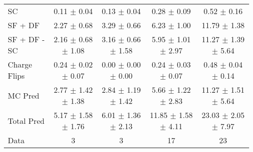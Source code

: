 \begin{tabular}{l|cccc}
                                 SC &  0.11 $\pm$  0.04 &  0.13 $\pm$  0.04 &  0.28 $\pm$  0.09 &  0.52 $\pm$  0.16 \\
                            SF + DF &  2.27 $\pm$  0.68 &  3.29 $\pm$  0.66 &  6.23 $\pm$  1.00 & 11.79 $\pm$  1.38 \\
\hline
                       SF + DF - SC &  2.16 $\pm$  0.68 $\pm$  1.08 &  3.16 $\pm$  0.66 $\pm$  1.58 &  5.95 $\pm$  1.01 $\pm$  2.97 & 11.27 $\pm$  1.39 $\pm$  5.64 \\
\hline\hline
                       Charge Flips &  0.24 $\pm$  0.02 $\pm$  0.07 &  0.00 $\pm$  0.00 $\pm$  0.00 &  0.24 $\pm$  0.03 $\pm$  0.07 &  0.48 $\pm$  0.04 $\pm$  0.14 \\
\hline
                            MC Pred &  2.77 $\pm$  1.42 $\pm$  1.38 &  2.84 $\pm$  1.19 $\pm$  1.42 &  5.66 $\pm$  1.22 $\pm$  2.83 & 11.27 $\pm$  1.51 $\pm$  5.64 \\
\hline
                         Total Pred &  5.17 $\pm$  1.58 $\pm$  1.76 &  6.01 $\pm$  1.36 $\pm$  2.13 & 11.85 $\pm$  1.58 $\pm$  4.11 & 23.03 $\pm$  2.05 $\pm$  7.97 \\
\hline\hline
                               Data &     3 &     3 &    17 &    23 \\
\hline\hline
\end{tabular}

